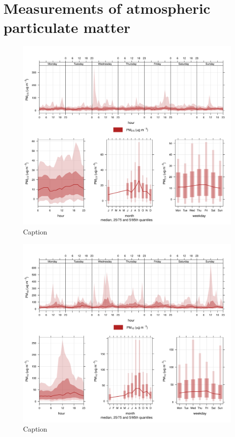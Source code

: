 \documentclass{nwureport}
\begin{document}
\section{Measurements of atmospheric particulate matter}


\begin{figure}[!htb]
    \centering
    \includegraphics[width=\textwidth]{images/Wedela_PM2-5_timevary.png}
    \caption{Caption}
    \label{fig:summary}
\end{figure}

\begin{figure}[!htb]
    \centering
    \includegraphics[width=\textwidth]{images/Wedela_PM10_timevary.png}
    \caption{Caption}
    \label{fig:summary}
\end{figure}
\end{document}
